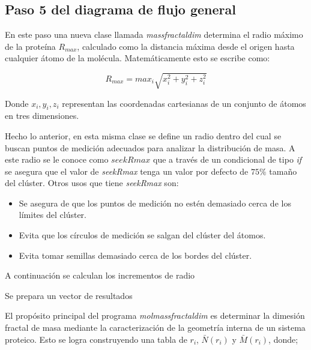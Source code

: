 	\subsection{Paso 5 del diagrama de flujo general}
	
	En este paso una nueva clase llamada \textit{massfractaldim} determina el radio máximo de la proteína $R_{max}$, calculado como la distancia máxima desde el origen hasta cualquier átomo de la molécula. Matemáticamente esto se escribe como:
	
	\begin{equation}
		R_{max} = max_{i} \sqrt{x^{2}_{i} + y^{2}_{i} + z^{2}_{i}}
	\end{equation}
 	
 	Donde $x_{i}, y_{i}, z_{i}$ representan las coordenadas cartesianas de un conjunto de átomos en tres dimensiones.
 	
 	Hecho lo anterior, en esta misma clase se define un radio dentro del cual se buscan puntos de medición adecuados para analizar la distribución de masa. A este radio se le conoce como $seekRmax$ que a través de un condicional de tipo \textit{if} se asegura que el valor de \textit{seekRmax} tenga un valor por defecto de $75\%$ tamaño del clúster. Otros usos que tiene \textit{seekRmax} son:
 	
 	\begin{itemize}
 		\item Se asegura de que los puntos de medición no estén demasiado cerca de los límites del clúster.
 		\item Evita que los círculos de medición se salgan del clúster del átomos. 
 		\item Evita tomar semillas demasiado cerca de los bordes del clúster.
 	\end{itemize}
 
 	A continuación se calculan los incrementos de radio
 	
 	Se prepara un vector de resultados 
 	
 
 
 
 
 
 
 
 
 
 

El propósito principal del programa \textit{molmassfractaldim} es determinar la dimesi\'{o}n fractal de masa mediante la caracterizaci\'{o}n de la geometría interna de un sistema proteico. Esto se logra construyendo una tabla de \(r_i\), \( \bar{N}(r_i)\) y \( \bar{M}(r_i)\), donde;

